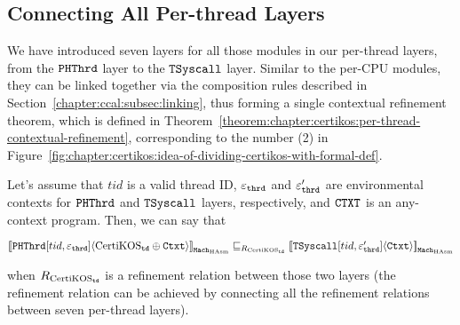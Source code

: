 \subsection{Connecting All Per-thread Layers}
\label{chapter:certikos:subsec:connecting-all-thread-layers}

We have introduced seven layers for all those modules in our per-thread layers, from the ${{\mathrm{\texttt{PHThrd}}}}$ layer to the 
${{\mathrm{\texttt{TSyscall}}}}$ layer.
Similar to the per-CPU modules, they  can be linked together via the composition rules described in Section~\ref{chapter:ccal:subsec:linking},
thus forming a single contextual refinement theorem, which is defined in Theorem~\ref{theorem:chapter:certikos:per-thread-contextual-refinement},
corresponding to  the number (2) in Figure~\ref{fig:chapter:certikos:idea-of-dividing-certikos-with-formal-def}.
\begin{theorem}
\label{theorem:chapter:certikos:per-thread-contextual-refinement}
Let's assume that $tid$ is a valid thread ID, ${\varepsilon}_{{\mathrm{\texttt{thrd}}}}$ and  ${\varepsilon}'_{{\mathrm{\texttt{thrd}}}}$ are environmental contexts for 
${{\mathrm{\texttt{PHThrd}}}}$  and ${{\mathrm{\texttt{TSyscall}}}}$ layers, respectively, and ${\mathrm{\texttt{CTXT}}}$ is an any-context program. Then, we can say that
\begin{center}
${[\![{{{\mathrm{\texttt{PHThrd}}}}[tid, {\varepsilon}_{{\mathrm{\texttt{thrd}}}}]} \langle {\mathrm{CertiKOS}_{{\mathrm{\texttt{td}}}} \oplus {\mathrm{\texttt{Ctxt}}}} \rangle]\!]}_{{\mathrm{\texttt{Mach}}}_{\mathrm{HAsm}}} \sqsubseteq_{R_{\mathrm{CertiKOS}_{\mathrm{\texttt{td}}}}} {[\![{{{\mathrm{\texttt{TSyscall}}}}[tid, {\varepsilon}'_{{\mathrm{\texttt{thrd}}}}]} \langle {{\mathrm{\texttt{Ctxt}}}} \rangle]\!]}_{{\mathrm{\texttt{Mach}}}_{\mathrm{HAsm}}}$
\end{center}
when ${R_{\mathrm{CertiKOS}_{\mathrm{\texttt{td}}}}}$ is a refinement relation between those two layers (the refinement relation can be achieved by 
connecting all the refinement relations  between seven per-thread layers).
\end{theorem}


